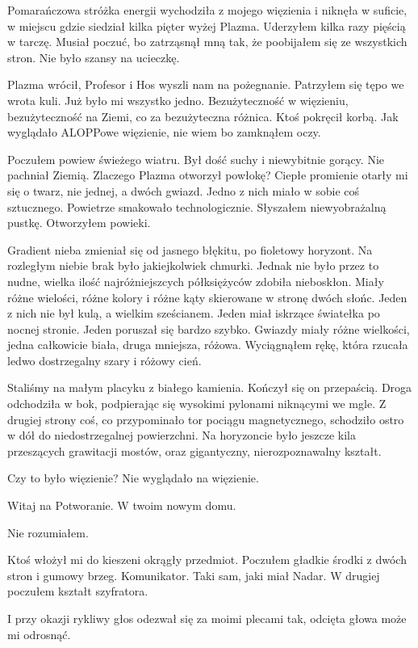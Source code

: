 Pomarańczowa stróżka energii wychodziła z mojego więzienia i niknęła w suficie, w miejscu gdzie siedział kilka pięter wyżej Plazma.
Uderzyłem kilka razy pięścią w tarczę.
Musiał poczuć, bo zatrząsnął mną tak, że poobijałem się ze wszystkich stron.
Nie było szansy na ucieczkę.

Plazma wrócił, Profesor i Hos wyszli nam na pożegnanie.
Patrzyłem się tępo we wrota kuli. Już było mi wszystko jedno. Bezużyteczność w więzieniu, bezużyteczność na Ziemi, co za bezużyteczna różnica.
Ktoś pokręcił korbą.
Jak wyglądało ALOPPowe więzienie, nie wiem bo zamknąłem oczy.

Poczułem powiew świeżego wiatru.
Był dość suchy i niewybitnie gorący. Nie pachniał Ziemią.
Zlaczego Plazma otworzył powłokę?
Ciepłe promienie otarły mi się o twarz, nie jednej, a dwóch gwiazd.
Jedno z nich miało w sobie coś sztucznego.
Powietrze smakowało technologicznie.
Słyszałem niewyobrażalną pustkę.
Otworzyłem powieki.

Gradient nieba zmieniał się od jasnego błękitu, po fioletowy horyzont.
Na rozległym niebie brak było jakiejkolwiek chmurki.
Jednak nie było przez to nudne, wielka ilość najróżniejszcych półksiężyców zdobiła nieboskłon.
Miały różne wielości, różne kolory i różne kąty skierowane w stronę dwóch słońc.
Jeden z nich nie był kulą, a wielkim sześcianem.
Jeden miał iskrzące światełka po nocnej stronie.
Jeden poruszał się bardzo szybko.
Gwiazdy miały różne wielkości, jedna całkowicie biała, druga mniejsza, różowa.
Wyciągnąłem rękę, która rzucała ledwo dostrzegalny szary i różowy cień.

Staliśmy na małym placyku z białego kamienia. Kończył się on przepaścią.
Droga odchodziła w bok, podpierając się wysokimi pylonami niknącymi we mgle.
Z drugiej strony coś, co przypominało tor pociągu magnetycznego, schodziło ostro w dół do niedostrzegalnej powierzchni.
Na horyzoncie było jeszcze kila przeszących grawitacji mostów, oraz gigantyczny, nierozpoznawalny kształt.

Czy to było więzienie? Nie wyglądało na więzienie.
\begin{dialogue}
\ds{} Witaj na Potworanie. W twoim nowym domu.
\end{dialogue}
Nie rozumiałem.

Ktoś włożył mi do kieszeni okrągły przedmiot.
Poczułem gładkie środki z dwóch stron i gumowy brzeg.
Komunikator. Taki sam, jaki miał Nadar.
W drugiej poczułem kształt szyfratora.

\begin{dialogue}
\ds{} I przy okazji \dm{} rykliwy głos odezwał się za moimi plecami \dm{} tak, odcięta głowa może mi odrosnąć.
\end{dialogue}

